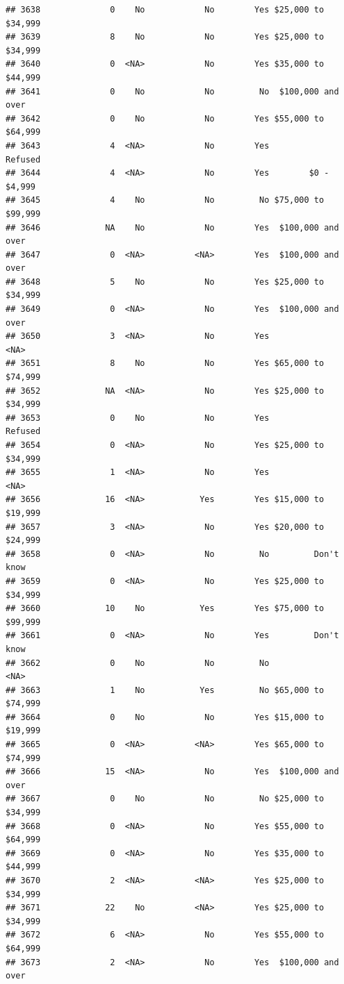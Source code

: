 \documentclass[man]{apa6}
\begin{document}
\begin{verbatim}
## 3638              0    No            No        Yes $25,000 to $34,999
## 3639              8    No            No        Yes $25,000 to $34,999
## 3640              0  <NA>            No        Yes $35,000 to $44,999
## 3641              0    No            No         No  $100,000 and over
## 3642              0    No            No        Yes $55,000 to $64,999
## 3643              4  <NA>            No        Yes            Refused
## 3644              4  <NA>            No        Yes        $0 - $4,999
## 3645              4    No            No         No $75,000 to $99,999
## 3646             NA    No            No        Yes  $100,000 and over
## 3647              0  <NA>          <NA>        Yes  $100,000 and over
## 3648              5    No            No        Yes $25,000 to $34,999
## 3649              0  <NA>            No        Yes  $100,000 and over
## 3650              3  <NA>            No        Yes               <NA>
## 3651              8    No            No        Yes $65,000 to $74,999
## 3652             NA  <NA>            No        Yes $25,000 to $34,999
## 3653              0    No            No        Yes            Refused
## 3654              0  <NA>            No        Yes $25,000 to $34,999
## 3655              1  <NA>            No        Yes               <NA>
## 3656             16  <NA>           Yes        Yes $15,000 to $19,999
## 3657              3  <NA>            No        Yes $20,000 to $24,999
## 3658              0  <NA>            No         No         Don't know
## 3659              0  <NA>            No        Yes $25,000 to $34,999
## 3660             10    No           Yes        Yes $75,000 to $99,999
## 3661              0  <NA>            No        Yes         Don't know
## 3662              0    No            No         No               <NA>
## 3663              1    No           Yes         No $65,000 to $74,999
## 3664              0    No            No        Yes $15,000 to $19,999
## 3665              0  <NA>          <NA>        Yes $65,000 to $74,999
## 3666             15  <NA>            No        Yes  $100,000 and over
## 3667              0    No            No         No $25,000 to $34,999
## 3668              0  <NA>            No        Yes $55,000 to $64,999
## 3669              0  <NA>            No        Yes $35,000 to $44,999
## 3670              2  <NA>          <NA>        Yes $25,000 to $34,999
## 3671             22    No          <NA>        Yes $25,000 to $34,999
## 3672              6  <NA>            No        Yes $55,000 to $64,999
## 3673              2  <NA>            No        Yes  $100,000 and over

\end{verbatim}
\end{document}
